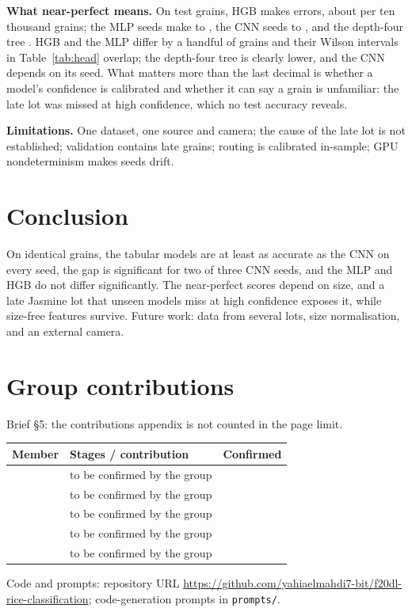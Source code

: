 \documentclass[conference,a4paper]{IEEEtran}
\begin{document}
\textbf{What near-perfect means.} On \TestN{} test grains, HGB makes \TestErrorsHgbAllOneZeroSix{} errors, about \ErrPerTenThousandHgb{} per ten thousand grains; the MLP seeds make \ErrPerTenThousandMlpMin{} to \ErrPerTenThousandMlpMax{}, the CNN seeds \ErrPerTenThousandCnnMin{} to \ErrPerTenThousandCnnMax, and the depth-four tree \ErrPerTenThousandTreeFour. HGB and the MLP differ by a handful of grains and their Wilson intervals in Table~\ref{tab:head} overlap; the depth-four tree is clearly lower, and the CNN depends on its seed. What matters more than the last decimal is whether a model's confidence is calibrated and whether it can say a grain is unfamiliar: the late lot was missed at high confidence, which no test accuracy reveals.

\textbf{Limitations.} One dataset, one source and camera; the cause of the late lot is not established; validation contains late grains; routing is calibrated in-sample; GPU nondeterminism makes seeds drift.


\section{Conclusion}
On identical grains, the tabular models are at least as accurate as the CNN on every seed, the gap is significant for two of three CNN seeds, and the MLP and HGB do not differ significantly. The near-perfect scores depend on size, and a late Jasmine lot that unseen models miss at high confidence exposes it, while size-free features survive. Future work: data from several lots, size normalisation, and an external camera.




\label{bodyend}
\clearpage
\appendices
\section{Group contributions}
Brief \S5: the contributions appendix is not counted in the page limit.

\begin{table}[h]
\centering\footnotesize
\begin{tabular}{p{}p{}l}
\toprule
Member & Stages / contribution & Confirmed\\
\midrule
 & to be confirmed by the group & \\
 & to be confirmed by the group & \\
 & to be confirmed by the group & \\
 & to be confirmed by the group & \\
 & to be confirmed by the group & \\
\bottomrule
\end{tabular}
\end{table}

Code and prompts: repository URL \url{https://github.com/yahiaelmahdi7-bit/f20dl-rice-classification}; code-generation prompts in \texttt{prompts/}.
\end{document}
